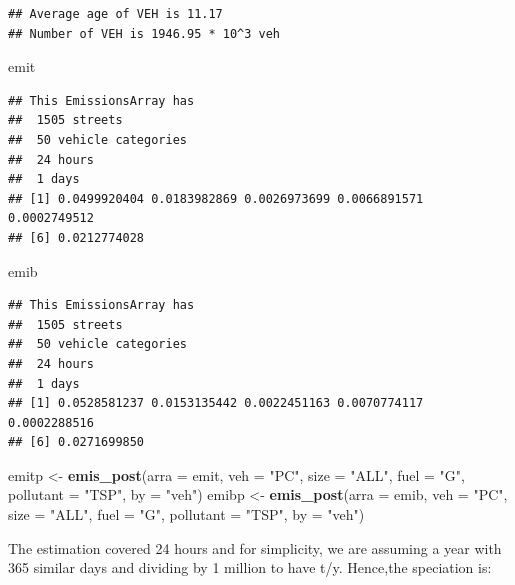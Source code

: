 \documentclass[12pt,graybox,envcountchap,sectrefs]{krantz}
\makeatletter
\newenvironment{Shaded}{\begin{snugshade}}{\end{snugshade}}
\newcommand{\KeywordTok}[1]{\textcolor[rgb]{0.13,0.29,0.53}{\textbf{#1}}}
\newcommand{\DataTypeTok}[1]{\textcolor[rgb]{0.13,0.29,0.53}{#1}}
\newcommand{\StringTok}[1]{\textcolor[rgb]{0.31,0.60,0.02}{#1}}
\newcommand{\NormalTok}[1]{#1}
\newenvironment{kframe}{%
\medskip{}
\setlength{\fboxsep}{.8em}
 \def\at@end@of@kframe{}%
 \ifinner\ifhmode%
  \def\at@end@of@kframe{\end{minipage}}%
  \begin{minipage}{\columnwidth}%
 \fi\fi%
 \def\FrameCommand##1{\hskip\@totalleftmargin \hskip-\fboxsep
 \colorbox{shadecolor}{##1}\hskip-\fboxsep
     \hskip-\linewidth \hskip-\@totalleftmargin \hskip\columnwidth}%
 \MakeFramed {\advance\hsize-\width
   \@totalleftmargin\z@ \linewidth\hsize
   \@setminipage}}%
 {\par\unskip\endMakeFramed%
 \at@end@of@kframe}
\renewenvironment{Shaded}{\begin{kframe}}{\end{kframe}}
\theoremstyle{definition}
\theoremstyle{definition}
\theoremstyle{definition}
\theoremstyle{remark}
\makeatother
\begin{document}
\begin{verbatim}
## Average age of VEH is 11.17
## Number of VEH is 1946.95 * 10^3 veh
\end{verbatim}

\begin{Shaded}
\begin{Highlighting}[]
\NormalTok{emit}
\end{Highlighting}
\end{Shaded}

\begin{verbatim}
## This EmissionsArray has
##  1505 streets
##  50 vehicle categories
##  24 hours
##  1 days
## [1] 0.0499920404 0.0183982869 0.0026973699 0.0066891571 0.0002749512
## [6] 0.0212774028
\end{verbatim}

\begin{Shaded}
\begin{Highlighting}[]
\NormalTok{emib}
\end{Highlighting}
\end{Shaded}

\begin{verbatim}
## This EmissionsArray has
##  1505 streets
##  50 vehicle categories
##  24 hours
##  1 days
## [1] 0.0528581237 0.0153135442 0.0022451163 0.0070774117 0.0002288516
## [6] 0.0271699850
\end{verbatim}

\begin{Shaded}
\begin{Highlighting}[]
\NormalTok{emitp <-}\StringTok{ }\KeywordTok{emis_post}\NormalTok{(}\DataTypeTok{arra =}\NormalTok{ emit, }\DataTypeTok{veh =} \StringTok{"PC"}\NormalTok{, }\DataTypeTok{size =} \StringTok{"ALL"}\NormalTok{, }\DataTypeTok{fuel =} \StringTok{"G"}\NormalTok{,}
                   \DataTypeTok{pollutant =} \StringTok{"TSP"}\NormalTok{, }\DataTypeTok{by =} \StringTok{"veh"}\NormalTok{)}
\NormalTok{emibp <-}\StringTok{ }\KeywordTok{emis_post}\NormalTok{(}\DataTypeTok{arra =}\NormalTok{ emib, }\DataTypeTok{veh =} \StringTok{"PC"}\NormalTok{, }\DataTypeTok{size =} \StringTok{"ALL"}\NormalTok{, }\DataTypeTok{fuel =} \StringTok{"G"}\NormalTok{,}
                   \DataTypeTok{pollutant =} \StringTok{"TSP"}\NormalTok{, }\DataTypeTok{by =} \StringTok{"veh"}\NormalTok{)}
\end{Highlighting}
\end{Shaded}

The estimation covered 24 hours and for simplicity, we are assuming a
year with 365 similar days and dividing by 1 million to have t/y.
Hence,the speciation is:
\end{document}
